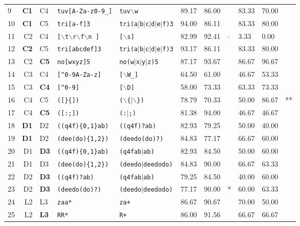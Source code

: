 \begin{table*}[ht]
\begin{tabular}{p{0.3cm}r@{ -- }lp{4cm}p{4cm}|p{0.91cm}p{0.91cm}p{0.4cm}|p{0.98cm}p{0.98cm}p{0.4cm}}
  9 & {\bf C1} & C4 & {\tt tuv[A-Za-z0-9\_]} & {\tt tuv$\backslash$w} & 89.17 & 86.00 &   & 83.33 & 70.00 &   \\ 
    10 & {\bf C1} & C5 & {\tt tri[a-f]3} & {\tt tri(a$|$b$|$c$|$d$|$e$|$f)3} & 94.00 & 86.11 &   & 83.33 & 80.00 &   \\ 
  11 & C2 & C4 & {\tt [$\backslash$t$\backslash$r$\backslash$f$\backslash$n ]} & {\tt [$\backslash$s]} & 82.99 & 92.41 & $\cdot$ & 3.33 & 0.00 &   \\ 
  12 & {\bf C2} & C5 & {\tt tri[abcdef]3} & {\tt tri(a$|$b$|$c$|$d$|$e$|$f)3} & 93.17 & 86.11 &   & 83.33 & 80.00 &   \\ 
  13 & C2 & {\bf C5} & {\tt no[wxyz]5} & {\tt no(w$|$x$|$y$|$z)5} & 87.17 & 93.67 &   & 86.67 & 96.67 &   \\ 
  14 & C3 & C4 & {\tt [\verb|^|0-9A-Za-z]} & {\tt [$\backslash$W\_]} & 64.50 & 61.00 &   & 46.67 & 53.33 &   \\ 
  15 & C3 & {\bf C4} & {\tt [\verb|^|0-9]} & {\tt [$\backslash$D]} & 58.00 & 73.33 &   & 63.33 & 73.33 &   \\ 
  16 & C4 & C5 & {\tt ([\}\{])} & {\tt ($\backslash$\{$|$$\backslash$\})} & 78.79 & 70.33 &   & 50.00 & 86.67 & ** \\ 
  17 & C4 & {\bf C5} & {\tt ([:;])} & {\tt (:$|$;)} & 81.38 & 94.00 &   & 46.67 & 46.67 &   \\ 
  \hline
  
  18 & {\bf D1} & D2 & {\tt ((q4f)\{0,1\}ab)} & {\tt ((q4f)?ab)} & 82.93 & 79.25 &   & 50.00 & 40.00 &   \\ 
  19 & {\bf D1} & D2 & {\tt (dee(do)\{1,2\})} & {\tt (deedo(do)?)} & 84.83 & 77.17 &   & 66.67 & 60.00 &   \\ 
  20 & D1 & {\bf D3} & {\tt ((q4f)\{0,1\}ab)} & {\tt (q4fab$|$ab)} & 82.93 & 84.50 &   & 50.00 & 60.00 &   \\ 
  21 & D1 & D3 & {\tt (dee(do)\{1,2\})} & {\tt (deedo$|$deedodo)} & 84.83 & 90.00 &   & 66.67 & 63.33 &   \\ 

  22 & D2 & {\bf D3} & {\tt ((q4f)?ab)} & {\tt (q4fab$|$ab)} & 79.25 & 84.50 &   & 40.00 & 60.00 &   \\ 
  23 & D2 & {\bf D3} & {\tt (deedo(do)?)} & {\tt (deedo$|$deedodo)} & 77.17 & 90.00 & * & 60.00 & 63.33 &   \\ 
  \hline
  
  24 & L2 & L3 & {\tt zaa*} & {\tt za+} & 86.67 & 90.67 &   & 70.00 & 50.00 &   \\ 
  25 & L2 & {\bf L3} & {\tt RR*} & {\tt R+} & 86.00 & 91.56 &   & 66.67 & 66.67 &   \\ 
  \hline
  

\end{tabular}
\end{table*}
